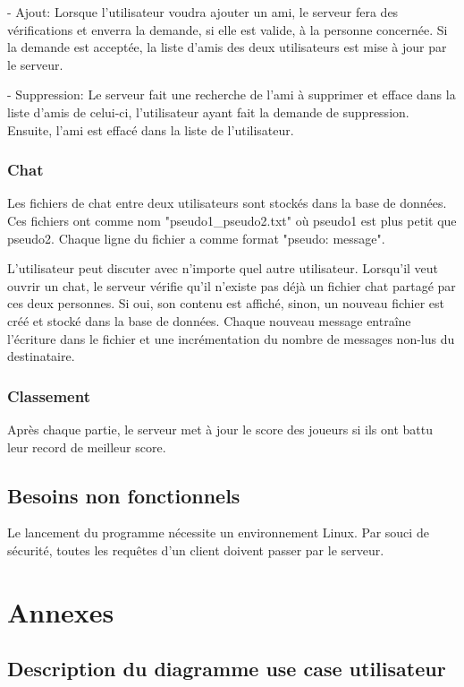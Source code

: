 \documentclass[a4paper,12pt]{article}
\begin{document}
- Ajout: Lorsque l'utilisateur voudra ajouter un ami, le serveur fera des vérifications et enverra la demande, si elle est valide, à la personne concernée. Si la demande est acceptée, la liste d'amis des deux utilisateurs est mise à jour par le serveur.

- Suppression: Le serveur fait une recherche de l'ami à supprimer et efface dans la liste d'amis de celui-ci, l'utilisateur ayant fait la demande de suppression. Ensuite, l'ami est effacé dans la liste de l'utilisateur.

\subsubsection{Chat}

Les fichiers de chat entre deux utilisateurs sont stockés dans la base de données. Ces fichiers ont comme nom "pseudo1\_pseudo2.txt" où pseudo1 est plus petit que pseudo2. Chaque ligne du fichier a comme format "pseudo: message".

L'utilisateur peut discuter avec n'importe quel autre utilisateur. Lorsqu'il veut ouvrir un chat, le serveur vérifie qu'il n'existe pas déjà un fichier chat partagé par ces deux personnes. Si oui, son contenu est affiché, sinon, un nouveau fichier est créé et stocké dans la base de données. Chaque nouveau message entraîne l'écriture dans le fichier et une incrémentation du nombre de messages non-lus du destinataire.

\subsubsection{Classement}

Après chaque partie, le serveur met à jour le score des joueurs si ils ont battu leur record de meilleur score.

\subsection{Besoins non fonctionnels}

Le lancement du programme nécessite un environnement Linux. Par souci de sécurité, toutes les requêtes d'un client doivent passer par le serveur.

\newpage
\section{Annexes}
\subsection{ Description du diagramme use case utilisateur}
\end{document}
